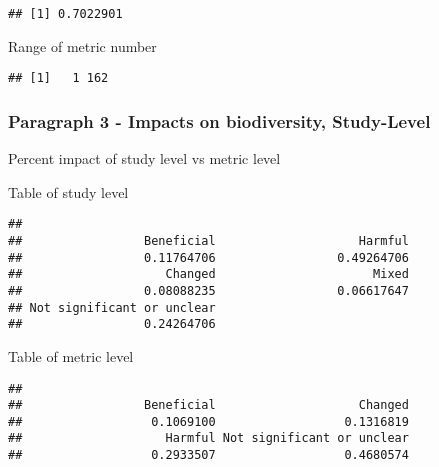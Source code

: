 \documentclass[
]{article}
\newenvironment{Shaded}{\begin{snugshade}}{\end{snugshade}}
\newcommand{\KeywordTok}[1]{\textcolor[rgb]{0.13,0.29,0.53}{\textbf{#1}}}
\newcommand{\NormalTok}[1]{#1}
\newcommand{\OperatorTok}[1]{\textcolor[rgb]{0.81,0.36,0.00}{\textbf{#1}}}
\begin{document}
\begin{verbatim}
## [1] 0.7022901
\end{verbatim}

Range of metric number

\begin{Shaded}
\end{Shaded}

\begin{verbatim}
## [1]   1 162
\end{verbatim}

\hypertarget{paragraph-3---impacts-on-biodiversity-study-level}{%
\subsubsection{Paragraph 3 - Impacts on biodiversity,
Study-Level}\label{paragraph-3---impacts-on-biodiversity-study-level}}

Percent impact of study level vs metric level

Table of study level

\begin{Shaded}
\end{Shaded}

\begin{verbatim}
## 
##                 Beneficial                    Harmful 
##                 0.11764706                 0.49264706 
##                    Changed                      Mixed 
##                 0.08088235                 0.06617647 
## Not significant or unclear 
##                 0.24264706
\end{verbatim}

Table of metric level

\begin{Shaded}
\end{Shaded}

\begin{verbatim}
## 
##                 Beneficial                    Changed 
##                  0.1069100                  0.1316819 
##                    Harmful Not significant or unclear 
##                  0.2933507                  0.4680574
\end{verbatim}
\end{document}
